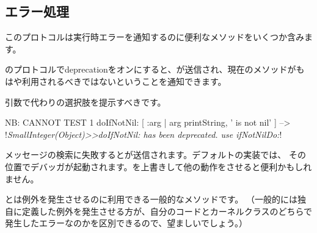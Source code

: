 \documentclass[a4paper,10pt,twoside]{book}
\begin{document}
\subsection{エラー処理}

このプロトコルは実行時エラーを通知するのに便利なメソッドをいくつか含みます。

のプロトコルでdeprecationをオンにすると、が送信され、現在のメソッドがもはや利用されるべきではないということを通知できます。

引数で代わりの選択肢を提示すべきです。

\begin{code}{NB: CANNOT TEST}
1 doIfNotNil: [ :arg | arg printString, ' is not nil' ]
  --> !\emph{SmallInteger(Object)>>doIfNotNil: has been deprecated. use ifNotNilDo:}!
\end{code}

メッセージの検索に失敗するとが送信されます。デフォルトの実装では、\ie {} その位置でデバッガが起動されます。を上書きして他の動作をさせると便利かもしれません。


とは例外を発生させるのに利用できる一般的なメソッドです。
（一般的には独自に定義した例外を発生させる方が、自分のコードとカーネルクラスのどちらで発生したエラーなのかを区別できるので、望ましいでしょう。）
\end{document}
